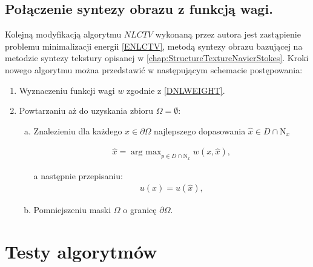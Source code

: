 \documentclass[12pt, twoside, openany]{report}
\theoremstyle{definition}
\begin{document}
\section{Połączenie syntezy obrazu z funkcją wagi.}
Kolejną modyfikacją algorytmu $NLCTV$ wykonaną przez autora jest zastąpienie problemu minimalizacji energii \eqref{ENLCTV}, metodą syntezy obrazu bazującej na metodzie syntezy tekstury opisanej w \autoref{chap:StructureTextureNavierStokes}. Kroki nowego algorytmu można przedstawić w następującym schemacie postępowania:
\begin{enumerate}
\item
Wyznaczeniu funkcji wagi $w$ zgodnie z \eqref{DNLWEIGHT}.
\item
Powtarzaniu aż do uzyskania zbioru $\Omega = \emptyset$:
\begin{enumerate}[a)]
\item
Znalezieniu dla każdego $x \in \partial\Omega$ najlepszego dopasowania $\hat{x} \in D \cap \mathrm{N}_x$
\begin{large}
\begin{align}
\hat{x} = \mathop{\mathrm{arg \ max}}_{p \in D \cap \mathrm{N}_x} w(x,\hat{x}),
\end{align}
\end{large}
a następnie przepisaniu:
\begin{align}
u(x) = \hat{u}(\hat{x}),
\end{align}
\item
Pomniejszeniu maski $\Omega$ o granicę $\partial\Omega$.
\end{enumerate}
\end{enumerate}
\chapter{Testy algorytmów}
\end{document}
